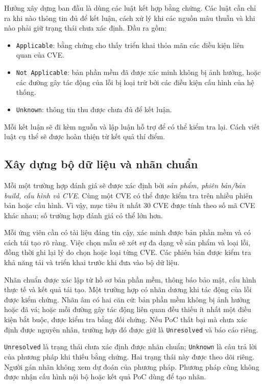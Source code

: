 \documentclass[11pt,a4paper]{article}
\begin{document}
Hướng xây dựng ban đầu là dùng các luật kết hợp bằng chứng. Các luật cần chỉ ra khi nào thông tin đủ để kết luận, cách xử lý khi các nguồn mâu thuẫn và khi nào phải giữ trạng thái chưa xác định. Đầu ra gồm:
\begin{itemize}
  \item \texttt{Applicable}: bằng chứng cho thấy triển khai thỏa mãn các điều kiện liên quan của CVE.
  \item \texttt{Not Applicable}: bản phần mềm đã được xác minh không bị ảnh hưởng, hoặc các đường gây tác động của lỗi bị loại trừ bởi các điều kiện cấu hình của hệ thống.
  \item \texttt{Unknown}: thông tin thu được chưa đủ để kết luận.
\end{itemize}

Mỗi kết luận sẽ đi kèm nguồn và lập luận hỗ trợ để có thể kiểm tra lại. Cách viết luật cụ thể sẽ được hoàn thiện từ kết quả thí điểm.

\subsection{Xây dựng bộ dữ liệu và nhãn chuẩn}

Mỗi một trường hợp đánh giá sẽ được xác định bởi \emph{sản phẩm, phiên bản/bản build, cấu hình và CVE}. Cùng một CVE có thể được kiểm tra trên nhiều phiên bản hoặc cấu hình. Vì vậy, mục tiêu ít nhất 30 CVE được tính theo số mã CVE khác nhau; số trường hợp đánh giá có thể lớn hơn.

Mỗi ứng viên cần có tài liệu đáng tin cậy, xác minh được bản phần mềm và có cách tái tạo rõ ràng. Việc chọn mẫu sẽ xét sự đa dạng về sản phẩm và loại lỗi, đồng thời ghi lại lý do chọn hoặc loại từng CVE. Các phiên bản được kiểm tra khả năng tải và triển khai trước khi đưa vào bộ dữ liệu.

Nhãn chuẩn được xác lập từ hồ sơ bản phần mềm, thông báo bảo mật, cấu hình thực tế và kết quả tái tạo. Một trường hợp có nhãn dương khi tác động của lỗi được kiểm chứng. Nhãn âm có hai căn cứ: bản phần mềm không bị ảnh hưởng hoặc đã vá; hoặc mỗi đường gây tác động liên quan đều thiếu ít nhất một điều kiện bắt buộc, được kiểm tra bằng đối chứng. Nếu PoC thất bại mà chưa xác định được nguyên nhân, trường hợp đó được giữ là \texttt{Unresolved} và báo cáo riêng.

\texttt{Unresolved} là trạng thái chưa xác định được nhãn chuẩn; \texttt{Unknown} là câu trả lời của phương pháp khi thiếu bằng chứng. Hai trạng thái này được theo dõi riêng. Người gán nhãn không xem dự đoán của phương pháp. Phương pháp cũng không được nhận cấu hình nội bộ hoặc kết quả PoC dùng để tạo nhãn.
\end{document}
